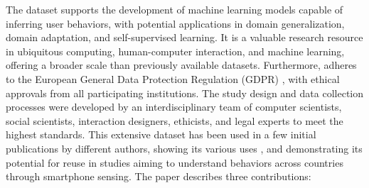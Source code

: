 The \dataset dataset supports the development of machine learning models capable of inferring user behaviors, with potential applications in domain generalization, domain adaptation, and self-supervised learning. It is a valuable research resource in ubiquitous computing, human-computer interaction, and machine learning, offering a broader scale than previously available datasets. Furthermore, \dataset adheres to the European General Data Protection Regulation (GDPR) \cite{GDPR2016}, with ethical approvals from all participating institutions. The study design and data collection processes were developed by an interdisciplinary team of computer scientists, social scientists, interaction designers, ethicists, and legal experts to meet the highest standards. This extensive dataset has been used in a few initial publications by different authors, showing its various uses \cite{meegahapola2023generalization,  kammoun2023understanding, assi2023complex,meegahapola2024m3bat, mader2024learning,girardini2023adaptation,mercado2023social}, and demonstrating its potential for reuse in studies aiming to understand behaviors across countries through smartphone sensing. The paper describes three contributions:

